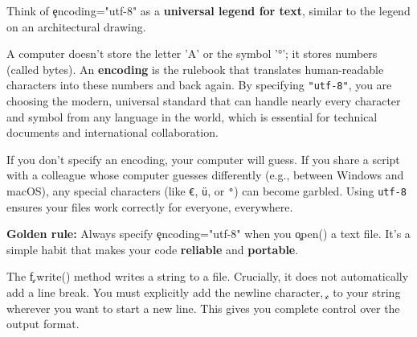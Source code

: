 
Think of \c{encoding="utf-8"} as a \textbf{universal legend for text}, similar to the legend on an architectural drawing.

A computer doesn't store the letter 'A' or the symbol '°'; it stores numbers (called bytes). An \textbf{encoding} is the rulebook that translates human-readable characters into these numbers and back again. By specifying \texttt{"utf-8"}, you are choosing the modern, universal standard that can handle nearly every character and symbol from any language in the world, which is essential for technical documents and international collaboration.

If you don't specify an encoding, your computer will guess. If you share a script with a colleague whose computer guesses differently (e.g., between Windows and macOS), any special characters (like \texttt{€}, \texttt{ü}, or \texttt{°}) can become garbled. Using \texttt{utf-8} ensures your files work correctly for everyone, everywhere.

\textbf{Golden rule:} Always specify \c{encoding="utf-8"} when you \c{open()} a text file. It’s a simple habit that makes your code \textbf{reliable} and \textbf{portable}.



The \c{f.write()} method writes a string to a file. Crucially, it does not automatically add a line break. You must explicitly add the newline character, \c{\n}, to your string wherever you want to start a new line. This gives you complete control over the output format.

